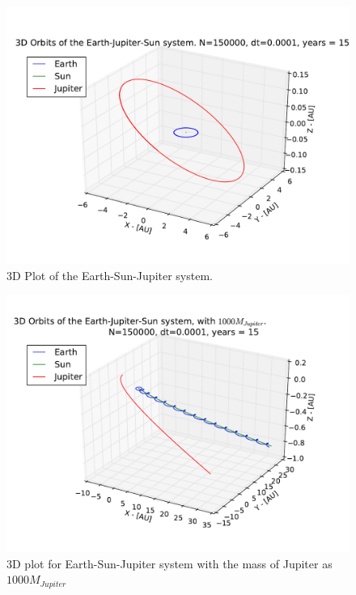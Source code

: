 \documentclass[12pt]{article}
\begin{document}
\begin{figure}[!h]
\centering
\includegraphics[width=\linewidth]{Plots/Earth_Sun_Jupiter_3D.pdf}
\caption{3D Plot of the Earth-Sun-Jupiter system.}
\label{fig:Appendix_3D_ESJ}
\end{figure}

\begin{figure}[!h]
\centering
\includegraphics[width=\linewidth]{Plots/Earth_Sun_Jupiter_1000MJ_3D.pdf}
\caption{3D plot for Earth-Sun-Jupiter system with the mass of Jupiter as $1000M_{Jupiter}$}
\label{fig:Appendix_1000MJ}
\end{figure}
\end{document}
